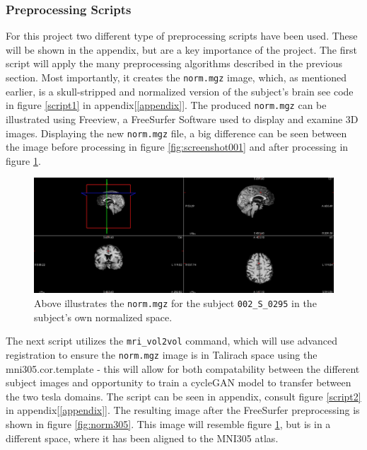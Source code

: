\documentclass[12pt, fleqn, titlepage]{article}
\newcommand{\1}[1]{\mathds{1}\left[#1\right]}
\begin{document}
\subsubsection{Preprocessing Scripts}
For this project two different type of preprocessing scripts have been used. These will be shown in the appendix, but are a key importance of the project. The first script will apply the many preprocessing algorithms described in the previous section. Most importantly, it creates the \texttt{norm.mgz} image, which, as mentioned earlier, is a skull-stripped and normalized version of the subject's brain see code in figure \ref{script1} in appendix[\ref{appendix}].
The produced \texttt{norm.mgz} can be illustrated using Freeview, a FreeSurfer Software used to display and examine 3D images. 
Displaying the new \texttt{norm.mgz} file, a big difference can be seen between the image before processing in figure \ref{fig:screenshot001} and after processing in figure \ref{fig:norm}.

\begin{figure}[H]
	\centering
	\includegraphics[width=0.9\linewidth]{imgs/norm}
	\caption{Above illustrates the \texttt{norm.mgz} for the subject \texttt{002\_S\_0295} in the subject's own normalized space.} 
	\label{fig:norm}
\end{figure}

The next script utilizes the \texttt{mri\_vol2vol} command, which will use advanced registration to ensure the \texttt{norm.mgz} image is in Talirach space using the mni305.cor.template - this will allow for both compatability between the different subject images and opportunity to train a cycleGAN model to transfer between the two tesla domains. The script can be seen in appendix, consult figure \ref{script2} in appendix[\ref{appendix}].
\noindent
The resulting image after the FreeSurfer preprocessing is shown in figure \ref{fig:norm305}. This image will resemble figure \ref{fig:norm}, but is in a different space, where it has been aligned to the MNI305 atlas. 
\end{document}
